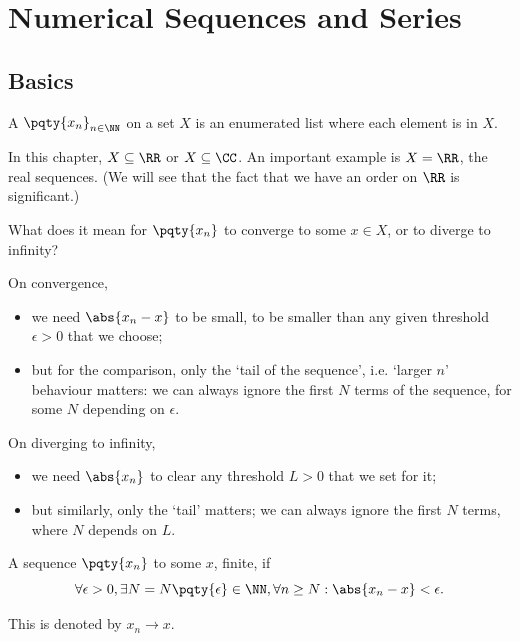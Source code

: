 \section{Numerical Sequences and Series}
\subsection{Basics}

\begin{definition}[Sequence]
    \label{def:sequence}%
    A  \(\pqty{x_n}_{n \in \NN}\) on a set \(X\) is an enumerated list where each element is in \(X\).
\end{definition}

In this chapter, \(X \subseteq \RR\) or \(X \subseteq \CC\). An important example is \(X = \RR\), the real sequences. (We will see that the fact that we have an order on \(\RR\) is significant.)

What does it mean for \(\pqty{x_n}\) to converge to some \(x \in X\), or to diverge to infinity?

On convergence,
\begin{itemize}
    \item we need \(\abs{x_n - x}\) to be small, to be smaller than any given threshold \(\epsilon > 0\) that we choose;
    \item but for the comparison, only the `tail of the sequence', i.e. `larger \(n\)' behaviour matters: we can always ignore the first \(N\) terms of the sequence, for some \(N\) depending on \(\epsilon\).
\end{itemize}

On diverging to infinity,
\begin{itemize}
    \item we need \(\abs{x_n}\) to clear any threshold \(L > 0\) that we set for it;
    \item but similarly, only the `tail' matters; we can always ignore the first \(N\) terms, where \(N\) depends on \(L\).
\end{itemize}

\begin{definition}
    \label{def:seq-convergence}%
    A sequence \(\pqty{x_n}\)  to some \(x\), finite, if
    \[
        \forall \epsilon > 0, \exists N = N \pqty{\epsilon} \in \NN, \forall n \geq N: \abs{x_n - x} < \epsilon.
    \]
    
    This is denoted by \(x_n \to x\).
\end{definition}

